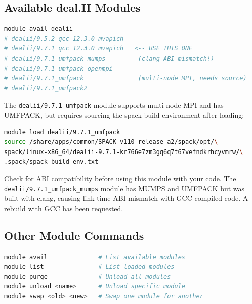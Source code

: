 \documentclass[11pt,a4paper]{article}
\begin{document}
\subsection{Available deal.II Modules}
\begin{lstlisting}[language=bash]
module avail dealii
# dealii/9.5.2_gcc_12.3.0_mvapich
# dealii/9.7.1_gcc_12.3.0_mvapich   <-- USE THIS ONE
# dealii/9.7.1_umfpack_mumps         (clang ABI mismatch!)
# dealii/9.7.1_umfpack_openmpi
# dealii/9.7.1_umfpack               (multi-node MPI, needs source)
# dealii/9.7.1_umfpack2
\end{lstlisting}

\begin{notebox}
The \texttt{dealii/9.7.1\_umfpack} module supports multi-node MPI and has UMFPACK,
but requires sourcing the spack build environment after loading:
\begin{lstlisting}[language=bash]
module load dealii/9.7.1_umfpack
source /share/apps/common/SPACK_v110_release_a2/spack/opt/\
spack/linux-x86_64/dealii-9.7.1-kr766e7zm3gq6q7t67vefndkrhcyvmrw/\
.spack/spack-build-env.txt
\end{lstlisting}
Check for ABI compatibility before using this module with your code.
The \texttt{dealii/9.7.1\_umfpack\_mumps} module has MUMPS and UMFPACK but
was built with clang, causing link-time ABI mismatch with GCC-compiled code.
A rebuild with GCC has been requested.
\end{notebox}
\subsection{Other Module Commands}
\begin{lstlisting}[language=bash]
module avail              # List available modules
module list               # List loaded modules
module purge              # Unload all modules
module unload <name>      # Unload specific module
module swap <old> <new>   # Swap one module for another
\end{lstlisting}
\end{document}
